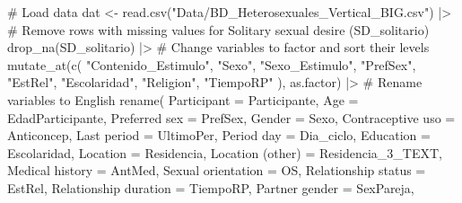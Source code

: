 \documentclass[
  bookmarksnumbered]{article}
\newenvironment{Shaded}{\begin{snugshade}}{\end{snugshade}}
\newcommand{\AttributeTok}[1]{\textcolor[rgb]{0.80,0.80,0.80}{#1}}
\newcommand{\CommentTok}[1]{\textcolor[rgb]{0.50,0.62,0.50}{#1}}
\newcommand{\FunctionTok}[1]{\textcolor[rgb]{0.94,0.94,0.56}{#1}}
\newcommand{\NormalTok}[1]{\textcolor[rgb]{0.80,0.80,0.80}{#1}}
\newcommand{\OtherTok}[1]{\textcolor[rgb]{0.94,0.94,0.56}{#1}}
\newcommand{\SpecialCharTok}[1]{\textcolor[rgb]{0.86,0.64,0.64}{#1}}
\newcommand{\StringTok}[1]{\textcolor[rgb]{0.80,0.58,0.58}{#1}}
\begin{document}
\begin{Shaded}
\begin{Highlighting}[]
\CommentTok{\# Load data}
\NormalTok{dat }\OtherTok{\textless{}{-}} \FunctionTok{read.csv}\NormalTok{(}\StringTok{"Data/BD\_Heterosexuales\_Vertical\_BIG.csv"}\NormalTok{) }\SpecialCharTok{|\textgreater{}}
  \CommentTok{\# Remove rows with missing values for Solitary sexual desire (SD\_solitario)}
  \FunctionTok{drop\_na}\NormalTok{(SD\_solitario) }\SpecialCharTok{|\textgreater{}}
  \CommentTok{\# Change variables to factor and sort their levels}
  \FunctionTok{mutate\_at}\NormalTok{(}\FunctionTok{c}\NormalTok{(}
    \StringTok{"Contenido\_Estimulo"}\NormalTok{, }\StringTok{"Sexo"}\NormalTok{, }\StringTok{"Sexo\_Estimulo"}\NormalTok{, }\StringTok{"PrefSex"}\NormalTok{, }\StringTok{"EstRel"}\NormalTok{, }\StringTok{"Escolaridad"}\NormalTok{,}
    \StringTok{"Religion"}\NormalTok{, }\StringTok{"TiempoRP"}
\NormalTok{  ), as.factor) }\SpecialCharTok{|\textgreater{}}
  \CommentTok{\# Rename variables to English}
  \FunctionTok{rename}\NormalTok{(}
    \AttributeTok{Participant =}\NormalTok{ Participante,}
    \AttributeTok{Age =}\NormalTok{ EdadParticipante,}
    \StringTok{\textasciigrave{}}\AttributeTok{Preferred sex}\StringTok{\textasciigrave{}} \OtherTok{=}\NormalTok{ PrefSex,}
    \AttributeTok{Gender =}\NormalTok{ Sexo,}
    \StringTok{\textasciigrave{}}\AttributeTok{Contraceptive uso}\StringTok{\textasciigrave{}} \OtherTok{=}\NormalTok{ Anticoncep,}
    \StringTok{\textasciigrave{}}\AttributeTok{Last period}\StringTok{\textasciigrave{}} \OtherTok{=}\NormalTok{ UltimoPer,}
    \StringTok{\textasciigrave{}}\AttributeTok{Period day}\StringTok{\textasciigrave{}} \OtherTok{=}\NormalTok{ Dia\_ciclo,}
    \AttributeTok{Education =}\NormalTok{ Escolaridad,}
    \AttributeTok{Location =}\NormalTok{ Residencia,}
    \StringTok{\textasciigrave{}}\AttributeTok{Location (other)}\StringTok{\textasciigrave{}} \OtherTok{=}\NormalTok{ Residencia\_3\_TEXT,}
    \StringTok{\textasciigrave{}}\AttributeTok{Medical history}\StringTok{\textasciigrave{}} \OtherTok{=}\NormalTok{ AntMed,}
    \StringTok{\textasciigrave{}}\AttributeTok{Sexual orientation}\StringTok{\textasciigrave{}} \OtherTok{=}\NormalTok{ OS,}
    \StringTok{\textasciigrave{}}\AttributeTok{Relationship status}\StringTok{\textasciigrave{}} \OtherTok{=}\NormalTok{ EstRel,}
    \StringTok{\textasciigrave{}}\AttributeTok{Relationship duration}\StringTok{\textasciigrave{}} \OtherTok{=}\NormalTok{ TiempoRP,}
    \StringTok{\textasciigrave{}}\AttributeTok{Partner gender}\StringTok{\textasciigrave{}} \OtherTok{=}\NormalTok{ SexPareja,}

\end{Highlighting}
\end{Shaded}
\end{document}
